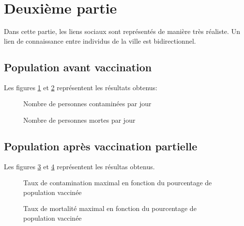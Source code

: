 \documentclass[12pt,a4paper,titlepage]{report}
\begin{document}
\section*{Deuxième partie}
Dans cette partie, les liens sociaux sont représentés de manière très réaliste. Un lien de 
connaissance entre individus de la ville est bidirectionnel.  
\subsection*{Population avant vaccination}
Les figures \ref{fig:2-1-nb-malades} et \ref{fig:2-1-nb-morts} représentent les résultats obtenus:
\begin{figure}[h]
  \centering
  \caption{Nombre de personnes contaminées par jour}
  \label{fig:2-1-nb-malades}
\end{figure}

\begin{figure}[h]
  \centering
  \caption{Nombre de personnes mortes par jour}
  \label{fig:2-1-nb-morts}
\end{figure}

\subsection*{Population après vaccination partielle}
Les figures \ref{fig:2-2-nb-malades} 
et \ref{fig:2-2-nb-morts} représentent les résultas obtenus.
\begin{figure}[h]
  \centering
  \caption{Taux de contamination maximal en fonction du pourcentage de population vaccinée}
  \label{fig:2-2-nb-malades}
\end{figure}

 \begin{figure}[h]
  \centering
  \caption{Taux de mortalité maximal en fonction du pourcentage de population vaccinée}
  \label{fig:2-2-nb-morts}
\end{figure}
\end{document}
